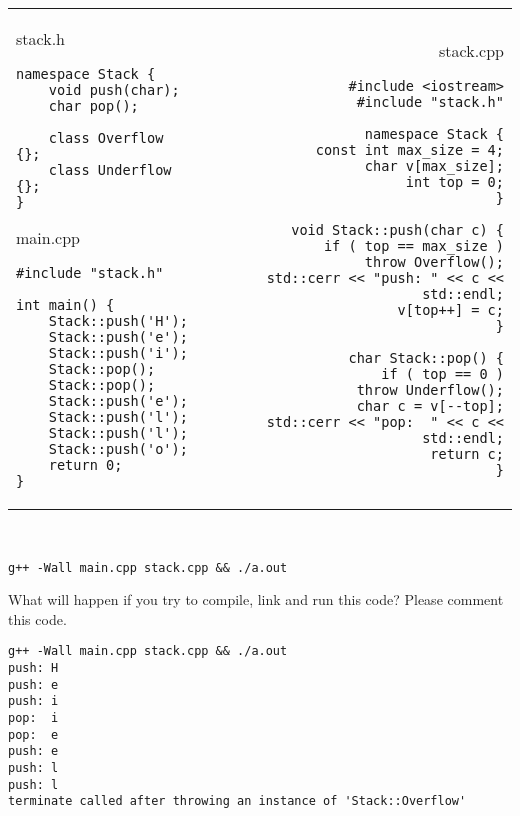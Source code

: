 \documentclass[landscape]{slides}
\begin{document}

\begin{slide}

\begin{tabular*}{\textwidth}{@{\extracolsep{\fill}}lr}

\begin{minipage}[t]{.32\linewidth}
\tiny{stack.h}
\begin{lstlisting}
namespace Stack {
    void push(char);
    char pop();

    class Overflow {};
    class Underflow {};
}
\end{lstlisting}
\tiny{main.cpp}
\begin{lstlisting}
#include "stack.h"

int main() {
    Stack::push('H');
    Stack::push('e');
    Stack::push('i');
    Stack::pop();
    Stack::pop();
    Stack::push('e');
    Stack::push('l');
    Stack::push('l');
    Stack::push('o');
    return 0;
}
\end{lstlisting}
\end{minipage}
&
\begin{minipage}[t]{.6\linewidth}
\tiny{stack.cpp}
\begin{lstlisting}
#include <iostream>
#include "stack.h"

namespace Stack {
    const int max_size = 4;
    char v[max_size];
    int top = 0;
}

void Stack::push(char c) {
    if ( top == max_size )
        throw Overflow();
    std::cerr << "push: " << c << std::endl;
    v[top++] = c;
}

char Stack::pop() {
    if ( top == 0 )
        throw Underflow();
    char c = v[--top];
    std::cerr << "pop:  " << c << std::endl;
    return c;
}
\end{lstlisting}
\end{minipage}

\end{tabular*}

\
 
\begin{lstlisting}[numbers=none]
g++ -Wall main.cpp stack.cpp && ./a.out
\end{lstlisting}

What will happen if you try to compile, link and run this code?
Please comment this code. 
\begin{note}
\begin{tiny}
\begin{verbatim}
g++ -Wall main.cpp stack.cpp && ./a.out
push: H
push: e
push: i
pop:  i
pop:  e
push: e
push: l
push: l
terminate called after throwing an instance of 'Stack::Overflow'


\end{verbatim}
\end{tiny}
\end{note}
\end{slide}
\end{document}
